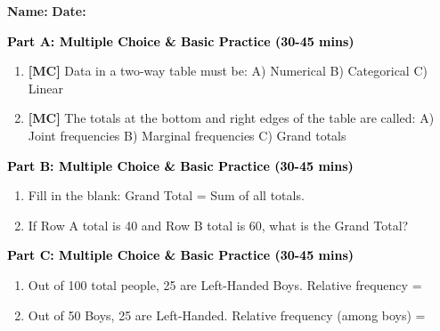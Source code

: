 \documentclass[12pt, letterpaper, fleqn]{article}
\newcommand{\blank}{\underline{\hspace{2.2cm}}}
\begin{document}
\textbf{Name:} \underline{\hspace{5cm}}
\hfill
\textbf{Date:} \underline{\hspace{3cm}}\\


\begin{tcolorbox}[colback=customteal!20]
\large\textcolor{black}{\textbf{Part A: Multiple Choice \& Basic Practice (30-45 mins)}}
\end{tcolorbox}

\vspace{3mm}

\begin{enumerate}[itemsep=2.5cm, leftmargin=0.6cm]
\item \textbf{[MC]} Data in a two-way table must be:
A) Numerical B) Categorical C) Linear
\item \textbf{[MC]} The totals at the bottom and right edges of the table are called:
A) Joint frequencies B) Marginal frequencies C) Grand totals
\end{enumerate}

\newpage

\begin{tcolorbox}[colback=customteal!20]
\large\textcolor{black}{\textbf{Part B: Multiple Choice \& Basic Practice (30-45 mins)}}
\end{tcolorbox}

\vspace{3mm}

\begin{enumerate}[itemsep=2.5cm, leftmargin=0.6cm, resume]
\item Fill in the blank: Grand Total = Sum of all \blank totals.
\item If Row A total is 40 and Row B total is 60, what is the Grand Total? \blank
\end{enumerate}

\newpage

\begin{tcolorbox}[colback=customteal!20]
\large\textcolor{black}{\textbf{Part C: Multiple Choice \& Basic Practice (30-45 mins)}}
\end{tcolorbox}

\vspace{3mm}

\begin{enumerate}[itemsep=2.5cm, leftmargin=0.6cm, resume]
\item Out of 100 total people, 25 are Left-Handed Boys. Relative frequency = \blank
\item Out of 50 Boys, 25 are Left-Handed. Relative frequency (among boys) = \blank
\end{enumerate}
\end{document}
